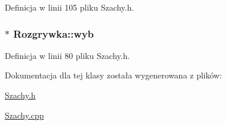 \-Definicja w linii 105 pliku \-Szachy.\-h.

\hypertarget{class_rozgrywka_a16162d348a75ac115dbf92f4bd7c4a32}{
\subsubsection[{wyb}]{$\ast$ {\bf \-Rozgrywka\-::wyb}}}\label{class_rozgrywka_a16162d348a75ac115dbf92f4bd7c4a32}


\-Definicja w linii 80 pliku \-Szachy.\-h.



\-Dokumentacja dla tej klasy została wygenerowana z plików\-:\begin{DoxyCompactItemize}
\item 
\hyperlink{_szachy_8h}{\-Szachy.\-h}\item 
\hyperlink{_szachy_8cpp}{\-Szachy.\-cpp}\end{DoxyCompactItemize}

